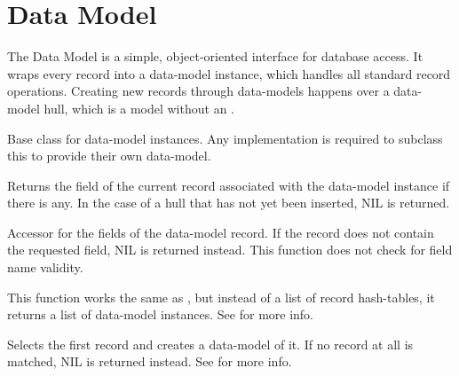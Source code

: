 \section{Data Model}
The Data Model is a simple, object-oriented interface for database access. It wraps every record into a data-model instance, which handles all standard record operations. Creating new records through data-models happens over a data-model hull, which is a model without an .

Base class for data-model instances. Any implementation is required to subclass this to provide their own data-model.

Returns the  field of the current record associated with the data-model instance if there is any. In the case of a hull that has not yet been inserted, NIL is returned.

Accessor for the fields of the data-model record. If the record does not contain the requested field, NIL is returned instead. This function does not check for field name validity.

This function works the same as , but instead of a list of record hash-tables, it returns a list of data-model instances. See  for more info.

Selects the first record and creates a data-model of it. If no record at all is matched, NIL is returned instead. See  for more info.

